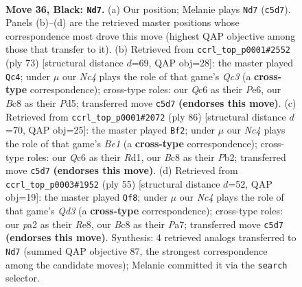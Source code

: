 \documentclass[11pt]{article}
\begin{document}
\clearpage

\begin{figure}[p]\centering
\begin{subfigure}{0.46\textwidth}\centering
\resizebox{\linewidth}{!}{%
\newchessgame
\chessboard[
  setfen={2b3k1/4rp1p/2q3p1/2n1PpN1/p1B2P2/8/PQP2KPP/6R1 b - - 9 36},
  showmover=false,
  pgfstyle=straightmove, color=movearrow, markmove={c5-d7}
]}
\caption{}
\end{subfigure}\hfill
\begin{subfigure}{0.46\textwidth}\centering
\resizebox{\linewidth}{!}{%
\newchessgame
\chessboard[
  setfen={6k1/p4rp1/1pq1p3/3pP2Q/3P1pR1/P1N5/1P1n1PP1/6K1 b - - 3 37},
  showmover=false,
  pgfstyle=straightmove, color=movearrow, markmove={c6-c4}
]}
\caption{}
\end{subfigure}
\\[4pt]
\begin{subfigure}{0.46\textwidth}\centering
\resizebox{\linewidth}{!}{%
\newchessgame
\chessboard[
  setfen={3r4/p1q4k/P1p2ppb/2p2n1p/2N4P/2PP1Q2/1P4P1/3RB1K1 w - - 3 44},
  showmover=false,
  pgfstyle=straightmove, color=movearrow, markmove={e1-f2}
]}
\caption{}
\end{subfigure}\hfill
\begin{subfigure}{0.46\textwidth}\centering
\resizebox{\linewidth}{!}{%
\newchessgame
\chessboard[
  setfen={4r3/p4N1k/b1nqp1pp/3p4/2pP3P/2P5/2PQBPP1/4R1K1 b - - 0 28},
  showmover=false,
  pgfstyle=straightmove, color=movearrow, markmove={d6-f8}
]}
\caption{}
\end{subfigure}
\caption{\textbf{Move 36, Black: \texttt{Nd7}.} (a) Our position; Melanie plays \texttt{Nd7} (\texttt{c5d7}). Panels (b)--(d) are the retrieved master positions whose correspondence most drove this move (highest QAP objective among those that transfer to it). (b) Retrieved from \texttt{ccrl\_top\_p0001\#2552} (ply 73) [structural distance $d$=69, QAP obj=28]: the master played \texttt{Qc4}; under $\mu$ our \emph{Nc4} plays the role of that game's \emph{Qc3} (a \textbf{cross-type} correspondence); cross-type roles: our \emph{Q}c6 as their \emph{P}e6, our \emph{B}c8 as their \emph{P}d5; transferred move \texttt{c5d7} \textbf{(endorses this move)}. (c) Retrieved from \texttt{ccrl\_top\_p0001\#2072} (ply 86) [structural distance $d$=70, QAP obj=25]: the master played \texttt{Bf2}; under $\mu$ our \emph{Nc4} plays the role of that game's \emph{Be1} (a \textbf{cross-type} correspondence); cross-type roles: our \emph{Q}c6 as their \emph{R}d1, our \emph{B}c8 as their \emph{P}b2; transferred move \texttt{c5d7} \textbf{(endorses this move)}. (d) Retrieved from \texttt{ccrl\_top\_p0003\#1952} (ply 55) [structural distance $d$=52, QAP obj=19]: the master played \texttt{Qf8}; under $\mu$ our \emph{Nc4} plays the role of that game's \emph{Qd3} (a \textbf{cross-type} correspondence); cross-type roles: our \emph{p}a2 as their \emph{R}e8, our \emph{B}c8 as their \emph{P}a7; transferred move \texttt{c5d7} \textbf{(endorses this move)}. Synthesis: 4 retrieved analogs transferred to \texttt{Nd7} (summed QAP objective 87, the strongest correspondence among the candidate moves); Melanie committed it via the \texttt{search} selector.}
\label{fig:thought-m71}
\end{figure}
\end{document}
